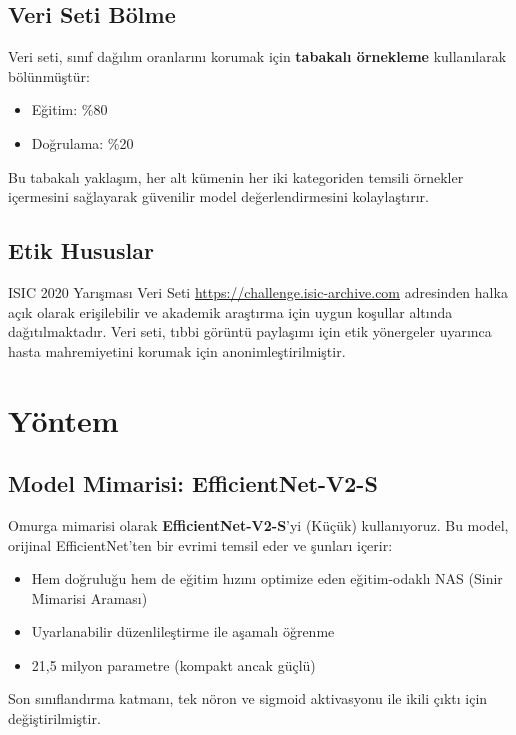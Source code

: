 \documentclass[12pt,a4paper]{article}
\begin{document}
\subsection{Veri Seti Bölme}

Veri seti, sınıf dağılım oranlarını korumak için \textbf{tabakalı örnekleme} kullanılarak bölünmüştür:
\begin{itemize}
    \item Eğitim: \%80
    \item Doğrulama: \%20
\end{itemize}

Bu tabakalı yaklaşım, her alt kümenin her iki kategoriden temsili örnekler içermesini sağlayarak güvenilir model değerlendirmesini kolaylaştırır.

\subsection{Etik Hususlar}

ISIC 2020 Yarışması Veri Seti \url{https://challenge.isic-archive.com} adresinden halka açık olarak erişilebilir ve akademik araştırma için uygun koşullar altında dağıtılmaktadır. Veri seti, tıbbi görüntü paylaşımı için etik yönergeler uyarınca hasta mahremiyetini korumak için anonimleştirilmiştir.

\section{Yöntem}
\label{sec:methodology}

\subsection{Model Mimarisi: EfficientNet-V2-S}

Omurga mimarisi olarak \textbf{EfficientNet-V2-S}'yi (Küçük) kullanıyoruz. Bu model, orijinal EfficientNet'ten bir evrimi temsil eder ve şunları içerir:
\begin{itemize}
    \item Hem doğruluğu hem de eğitim hızını optimize eden eğitim-odaklı NAS (Sinir Mimarisi Araması)
    \item Uyarlanabilir düzenlileştirme ile aşamalı öğrenme
    \item 21,5 milyon parametre (kompakt ancak güçlü)
\end{itemize}

Son sınıflandırma katmanı, tek nöron ve sigmoid aktivasyonu ile ikili çıktı için değiştirilmiştir.
\end{document}

